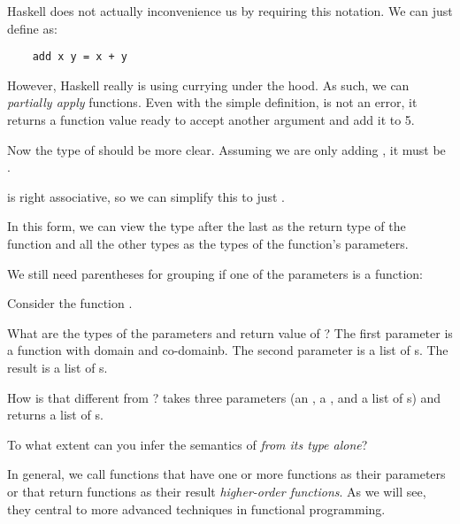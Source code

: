 \begin{notelist}
    \item Haskell does not actually inconvenience us by requiring this notation. We can just define  as:
    \begin{lstlisting} 
    add x y = x + y
    \end{lstlisting} 

    \item However, Haskell really is using currying under the hood. As such, we can \textit{partially apply}
          functions. Even with the simple definition,  is not an error, it returns a function value
          ready to accept another argument and add it to 5.

    \item Now the type of  should be more clear. Assuming we are only adding , it must
          be . 

    \item \code{->} is right associative, so we can simplify this to just .

    \item In this form, we can view the type after the last \code{->} as the return type of the function and
          all the other types as the types of the function's parameters.

    \item We still need parentheses for grouping if one of the parameters is a function:
    \begin{notelist}
        \item Consider the function .
        \item What are the types of the parameters and return value of ? The first parameter is a function
              with domain  and co-domain{b}. The second parameter is a list of s. The result
              is a list of s.
        \item How is that different from ?  takes three parameters
              (an , a , and a list of s) and returns a list of s.
        \item To what extent can you infer the semantics of  \textit{from its type alone}?
    \end{notelist}
    
    \item In general, we call functions that have one or more functions as their parameters or that return functions
          as their result \textit{higher-order functions}. As we will see, they central to more advanced techniques
          in functional programming.
\end{notelist}
